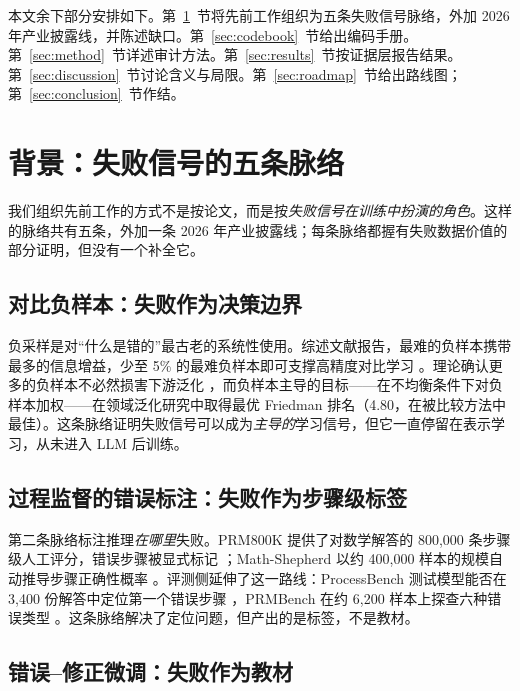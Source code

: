\documentclass[10pt,fontset=fandol]{ctexart}
\begin{document}
本文余下部分安排如下。第~\ref{sec:background}~节将先前工作组织为五条失败信号脉络，外加 2026 年产业披露线，并陈述缺口。第~\ref{sec:codebook}~节给出编码手册。第~\ref{sec:method}~节详述审计方法。第~\ref{sec:results}~节按证据层报告结果。第~\ref{sec:discussion}~节讨论含义与局限。第~\ref{sec:roadmap}~节给出路线图；第~\ref{sec:conclusion}~节作结。

\section{背景：失败信号的五条脉络}\label{sec:background}

我们组织先前工作的方式不是按论文，而是按\emph{失败信号在训练中扮演的角色}。这样的脉络共有五条，外加一条 2026 年产业披露线；每条脉络都握有失败数据价值的部分证明，但没有一个补全它。

\subsection{对比负样本：失败作为决策边界}

负采样是对“什么是错的”最古老的系统性使用。综述文献报告，最难的负样本携带最多的信息增益，少至 5\% 的最难负样本即可支撑高精度对比学习 \cite{yang2024negsampling}。理论确认更多的负样本不必然损害下游泛化 \cite{awasthi2022negative}，而负样本主导的目标——在不均衡条件下对负样本加权——在领域泛化研究中取得最优 Friedman 排名（4.80，在被比较方法中最佳）\cite{cao2026ndcl}。这条脉络证明失败信号可以成为\emph{主导的}学习信号，但它一直停留在表示学习，从未进入 LLM 后训练。

\subsection{过程监督的错误标注：失败作为步骤级标签}

第二条脉络标注推理\emph{在哪里}失败。PRM800K 提供了对数学解答的 800,000 条步骤级人工评分，错误步骤被显式标记 \cite{lightman2023verify}；Math-Shepherd 以约 400,000 样本的规模自动推导步骤正确性概率 \cite{wang2024mathshepherd}。评测侧延伸了这一路线：ProcessBench 测试模型能否在 3,400 份解答中定位第一个错误步骤 \cite{zheng2024processbench}，PRMBench 在约 6,200 样本上探查六种错误类型 \cite{song2025prmbench}。这条脉络解决了定位问题，但产出的是标签，不是教材。

\subsection{错误--修正微调：失败作为教材}
\end{document}
